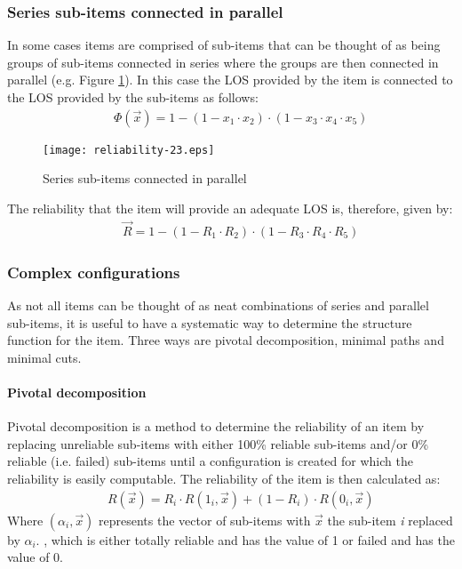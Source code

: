 \subsubsection{Series sub-items connected in parallel}
In some cases items are comprised of sub-items that can be thought of as being
groups of sub-items connected in series where the groups are then connected in
parallel (e.g. Figure \ref{reliability-23}). In this case the LOS provided by the item is
connected to the LOS provided by the sub-items as follows: 
%
\begin{eqnarray}
&& \Phi (\vec x) = 1 - (1 - {x_1} \cdot {x_2}) \cdot (1 - {x_3} \cdot {x_4} \cdot {x_5})
\label{eqreliability:211}
\end{eqnarray}
\begin{figure}[h]
\texttt{[image: reliability-23.eps]}
\caption{Series sub-items connected in parallel}\label{reliability-23}
\end{figure}
The reliability that the item will provide an adequate LOS is, therefore, given by:
\begin{eqnarray}
&& \vec R = 1 - (1 - {R_1} \cdot {R_2}) \cdot (1 - {R_3} \cdot {R_4} \cdot {R_5})
\label{eqreliability:21}
\end{eqnarray}
\subsubsection{Complex configurations}
As not all items can be thought of as neat combinations of series and parallel
sub-items, it is useful to have a systematic way to determine the structure
function for the item. Three ways are pivotal decomposition, minimal paths and
minimal cuts.
\paragraph{Pivotal decomposition}
Pivotal decomposition is a method to determine the reliability of an item by
replacing unreliable sub-items with either 100\% reliable sub-items and/or 0\%
reliable (i.e. failed) sub-items until a configuration is created for which the
reliability is easily computable. The reliability of the item is then calculated
as:
\begin{eqnarray}
&& R\left( {\overrightarrow x } \right) = {R_i} \cdot R\left(
{{1_i},\overrightarrow x } \right) + \left( {1 - {R_i}} \right) \cdot R\left(
{{0_i},\overrightarrow x } \right)
\end{eqnarray}
Where \textit{ }$\left( {{\alpha _i},\overrightarrow x }
\right)$ represents the vector of sub-items  with $\overrightarrow x $ the sub-item
\textit{i} replaced by \textit{$\alpha{}$$_{i}$}. , which is either totally
reliable and has the value of 1 or failed and has the value of 0.
